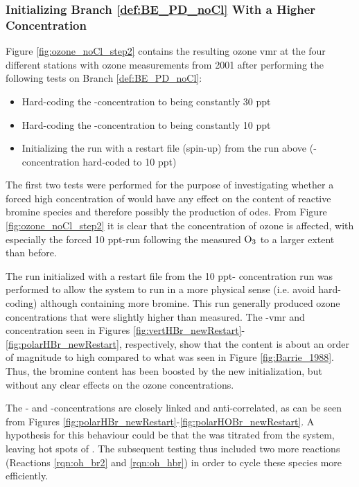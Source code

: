 \subsubsection{Initializing Branch \ref{def:BE_PD_noCl} With a Higher  Concentration}\label{sec:disc_step2}

Figure \ref{fig:ozone_noCl_step2} contains the resulting ozone \acrshort{vmr} at the four different stations with ozone measurements from 2001 after performing the following tests on Branch \ref{def:BE_PD_noCl}: 

\begin{itemize}
    \item Hard-coding the -concentration to being constantly 30 ppt 
    \item Hard-coding the -concentration to being constantly 10 ppt
    \item Initializing the run with a restart file (spin-up) from the run above (-concentration hard-coded to 10 ppt)
\end{itemize}

The first two tests were performed for the purpose of investigating whether a forced high concentration of  would have any effect on the content of reactive bromine species and therefore possibly the production of \acrshort{ode}s. From Figure \ref{fig:ozone_noCl_step2} it is clear that the concentration of ozone is affected, with especially the forced 10 ppt-run following the measured $\mathrm{O_3}$ to a larger extent than before. 

\medskip

The run initialized with a restart file from the 10 ppt- concentration run was performed to allow the system to run in a more physical sense (i.e. avoid hard-coding) although containing more bromine. This run generally produced ozone concentrations that were slightly higher than measured. The -\acrshort{vmr} and concentration seen in Figures \ref{fig:vertHBr_newRestart}-\ref{fig:polarHBr_newRestart}, respectively, show that the content is about an order of magnitude to high compared to what was seen in Figure \ref{fig:Barrie_1988}. Thus, the bromine content has been boosted by the new initialization, but without any clear effects on the ozone concentrations. 

\medskip

The - and -concentrations are closely linked and anti-correlated, as can be seen from Figures \ref{fig:polarHBr_newRestart}-\ref{fig:polarHOBr_newRestart}. A hypothesis for this behaviour could be that the  was titrated from the system, leaving hot spots of . The subsequent testing thus included two more reactions (Reactions \ref{rqn:oh_br2} and \ref{rqn:oh_hbr}) in order to cycle these species more efficiently. 

